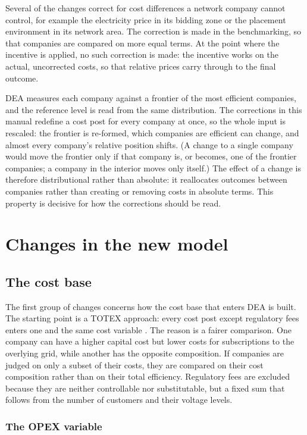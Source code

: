 Several of the changes correct for cost differences a network company cannot control, for example the
electricity price in its bidding zone or the placement environment in its network area. The
correction is made in the benchmarking, so that companies are compared on more equal terms. At
the point where the incentive is applied, no such correction is made: the incentive works on the
actual, uncorrected costs, so that relative prices carry through to the final outcome.

DEA measures each company against a frontier of the most efficient companies, and the reference level is read from the same distribution. The
corrections in this manual redefine a cost post for every company at once, so the whole input is
rescaled: the frontier is re-formed, which companies are efficient can change, and almost every
company's relative position shifts. (A change to a single company would move the frontier only if
that company is, or becomes, one of the frontier companies; a company in the interior moves only
itself.) The effect of a change is therefore distributional rather than absolute: it reallocates
outcomes between companies rather than creating or removing costs in absolute terms. This property
is decisive for how the corrections should be read.

\section{Changes in the new model}
\label{sec:partI}

\subsection{The cost base}

The first group of changes concerns how the cost base that enters DEA is built. The starting
point is a TOTEX approach: every cost post except regulatory fees enters one and the same cost
variable \citep{Ei2025Benchmarking}. The reason is a fairer comparison. One company can have a
higher capital cost but lower costs for subscriptions to the overlying grid, while another has the
opposite composition. If companies are judged on only a subset of their costs, they are compared
on their cost composition rather than on their total efficiency. Regulatory fees are excluded
because they are neither controllable nor substitutable, but a fixed sum that follows from the
number of customers and their voltage levels.

\subsubsection{The OPEX variable}

